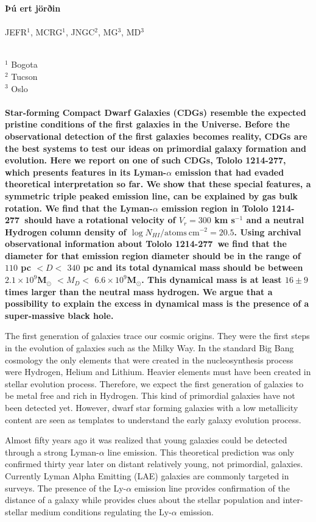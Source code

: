 \documentclass[a4paper, usenatbib, 12pt]{article}
\newcommand{\tol}{Tololo 1214-277}
\begin{document}
\pagestyle{empty}
\noindent
\textbf{Þú ert jörðin}
\\
\\
JEFR$^{1}$, MCRG$^1$, JNGC$^2$, MG$^3$, MD$^3$
\\
\\
\scriptsize
{$^1$ Bogota
\\
$^2$ Tucson
\\
$^3$ Oslo
\normalsize
\\
\\
\textbf{
  Star-forming Compact Dwarf Galaxies (CDGs) resemble the expected
  pristine conditions of the first galaxies in the Universe.    
Before the observational detection of the first galaxies becomes
reality, CDGs are the best systems to test our ideas on primordial
galaxy formation and evolution.    
Here we report on one of such CDGs, \tol, which presents
features in its Lyman-$\alpha$ emission that had evaded theoretical
interpretation so far. 
We show that these special features, a symmetric triple peaked
emission line, can be explained by gas bulk rotation.  
We find that the Lyman-$\alpha$ emission region in \tol\ should
have a rotational velocity of $V_{r}=300$ km s$^{-1}$ and a neutral
Hydrogen column density of $\log N_{HI} / \mathrm{atoms\ cm}^{-2} =
  20.5$.   
Using archival observational information about \tol\ we find that the
diameter for that emission region diameter should be in the range of
$110$ pc $<D<$ $340$ pc and its total dynamical mass   should be
between $2.1\times 10^{9}$M$_{\odot}$ $<M_D<$  $6.6\times
10^{9}$M$_{\odot}$.  
This dynamical mass is at least $16\pm 9$ times
larger than the neutral mass hydrogen.
We argue that a possibility to explain the excess in
dynamical mass is the presence of a super-massive black hole. }  



The first generation of galaxies trace our cosmic origins. 
They were the first steps in the evolution of galaxies such as the Milky
Way. 
In the standard Big Bang cosmology the only elements that were
created in the nucleosynthesis process were Hydrogen, Helium and
Lithium. 
Heavier elements must have been created in stellar evolution process. 
Therefore, we expect the first generation of
galaxies to be metal free and rich in Hydrogen. 
This kind of primordial galaxies have not been detected yet. 
However, dwarf star forming galaxies with a low metallicity content
are seen as templates to understand the early galaxy evolution process. 

Almost fifty years ago \cite{PartridgePeebles} it was realized that
young galaxies could be detected through a strong Lyman-$\alpha$ line
emission.  
This theoretical prediction was only confirmed thirty year later on
distant relatively young, not primordial, galaxies.
Currently Lyman Alpha Emitting (LAE) galaxies are commonly targeted
in surveys. 
The presence of the Ly-$\alpha$ emission line provides confirmation of
the distance of a galaxy while provides clues about the stellar
population and inter-stellar medium conditions regulating the
Ly-$\alpha$ emission. 

}
\end{document}
